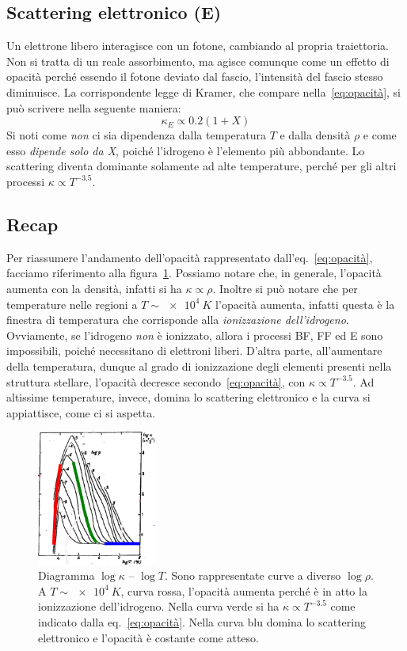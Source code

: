 \subsection{Scattering elettronico (E)}\label{sec:electron-scattering}
Un elettrone libero interagisce con un fotone, cambiando al propria traiettoria. Non si tratta di un reale assorbimento, ma agisce comunque come un effetto di opacità perché essendo il fotone deviato dal fascio, l'intensità del fascio stesso diminuisce. La corrispondente legge di Kramer, che compare nella~\eqref{eq:opacità}, si può scrivere nella seguente maniera:
\begin{equation}
    \kappa_E \propto 0.2(1+X)
\end{equation}
Si noti come \emph{non} ci sia dipendenza dalla temperatura $T$ e dalla densità $\rho$ e come esso \emph{dipende solo da X}, poiché l'idrogeno è l'elemento più abbondante. Lo scattering diventa dominante solamente ad alte temperature, perché per gli altri processi $\kappa \propto T^{-3.5}$.

\subsection{Recap}
Per riassumere l'andamento dell'opacità rappresentato dall'eq.~\eqref{eq:opacità}, facciamo riferimento alla figura~\ref{fig:opacità}. Possiamo notare che, in generale, l'opacità aumenta con la densità, infatti si ha $\kappa \propto \rho$. Inoltre si può notare che per temperature nelle regioni a $T \sim \SI{e4}{K}$ l'opacità aumenta, infatti questa è la finestra di temperatura che corrisponde alla \emph{ionizzazione dell'idrogeno}. Ovviamente, se l'idrogeno \emph{non} è ionizzato, allora i processi BF, FF ed E sono impossibili, poiché necessitano di elettroni liberi. D'altra parte, all'aumentare della temperatura, dunque al grado di ionizzazione degli elementi presenti nella struttura stellare, l'opacità decresce secondo~\eqref{eq:opacità}, con $\kappa \propto T^{-3.5}$. Ad altissime temperature, invece, domina lo scattering elettronico e la curva si appiattisce, come ci si  aspetta.

\begin{figure}
    \centering
    \includegraphics[width=0.35\textwidth]{immagini/opacita.png}
    \caption{Diagramma $\log \kappa$ -- $\log T$. Sono rappresentate curve a diverso $\log \rho$. A $T \sim \SI{e4}{K}$, curva rossa, l'opacità aumenta perché è in atto la ionizzazione dell'idrogeno. Nella curva verde si ha $\kappa \propto T^{-3.5}$ come indicato dalla eq.~\eqref{eq:opacità}. Nella curva blu domina lo scattering elettronico e l'opacità è costante come atteso.}
    \label{fig:opacità}
\end{figure}